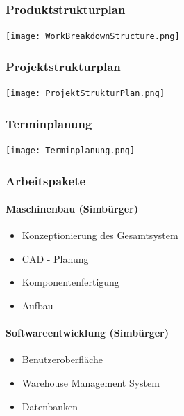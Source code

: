 \subsubsection{Produktstrukturplan}
\vspace{5mm}

\bgroup
    \centering
    \texttt{[image: WorkBreakdownStructure.png]}
\egroup

\subsubsection{Projektstrukturplan}
\vspace{5mm}

\bgroup
    \centering
    \texttt{[image: ProjektStrukturPlan.png]}
\egroup

\newpage
\subsubsection{Terminplanung}
\vspace{5mm}

\bgroup
    \centering
    \texttt{[image: Terminplanung.png]}
\egroup

\newpage

\subsubsection{Arbeitspakete}

\paragraph{Maschinenbau (Simbürger)}
\begin{itemize}
    \item Konzeptionierung des Gesamtsystem
    \item CAD - Planung
    \item Komponentenfertigung
    \item Aufbau 
\end{itemize}

\paragraph{Softwareentwicklung (Simbürger)}
\begin{itemize}
    \item Benutzeroberfläche
    \item Warehouse Management System
    \item Datenbanken
\end{itemize}

